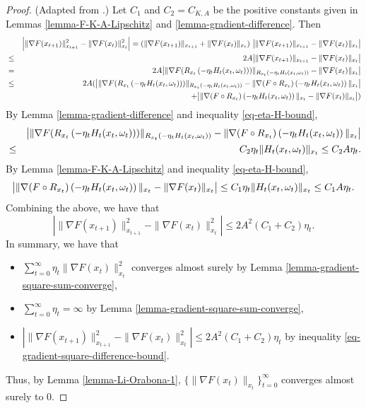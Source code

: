 \documentclass{amsart}
\theoremstyle{plain}
\theoremstyle{definition}
\theoremstyle{remark}
\numberwithin{theorem}{section}
\numberwithin{equation}{section}
\begin{document}
\begin{proof} (Adapted from \cite{Li-Orabona}.)
Let $C_1$ and $C_2=C_{K,A}$ be the positive constants given in Lemmas \ref{lemma-F-K-A-Lipschitz} and \ref{lemma-gradient-difference}. Then 
\begin{eqnarray*}
&& \left|\|\nabla F(x_{t+1})\|_{x_{t+1}}^2 -\|\nabla F(x_{t})\|_{x_{t}}^2\right| = (\|\nabla F(x_{t+1})\|_{x_{t+1}}+\|\nabla F(x_{t})\|_{x_{t}})~\big{|}\|\nabla F(x_{t+1})\|_{x_{t+1}} -\|\nabla F(x_{t})\|_{x_{t}}\big{|} \\
& \leq & 2A\big{|}\|\nabla F(x_{t+1})\|_{x_{t+1}} -\|\nabla F(x_{t})\|_{x_{t}}\big{|}\\
& = & 2A\big{|}\|\nabla F(R_{x_t}\left(-\eta_t H_t(x_t,\omega_t)\right))\|_{R_{x_t}\left(-\eta_t H_t(x_t,\omega_t)\right)} -\|\nabla F(x_{t})\|_{x_{t}}\big{|} \\
& \leq & 2A(\big{|}\|\nabla F(R_{x_t}\left(-\eta_t H_t(x_t,\omega_t)\right))\|_{R_{x_t}\left(-\eta_t H_t(x_t,\omega_t)\right)} -\|\nabla (F\circ R_{x_t})\left(-\eta_t H_t(x_t,\omega_t)\right)\|_{x_{t}}\big{|} \\
&& +  \big{|} \|\nabla (F\circ R_{x_t})\left(-\eta_t H_t(x_t,\omega_t)\right)\|_{x_{t}}  -\|\nabla F(x_{t})\|_{x_{t}}\big{|})
\end{eqnarray*}
By Lemma \ref{lemma-gradient-difference} and inequality \eqref{eq-eta-H-bound},
\begin{eqnarray*}
&& \big{|}\|\nabla F(R_{x_t}\left(-\eta_t H_t(x_t,\omega_t)\right))\|_{R_{x_t}\left(-\eta_t H_t(x_t,\omega_t)\right)} -\|\nabla (F\circ R_{x_t})\left(-\eta_t H_t(x_t,\omega_t)\right)\|_{x_{t}}\big{|} \\
& \leq &  C_2 \eta_t  \|H_t(x_t,\omega_t)\|_{x_{t}} \leq C_2 A \eta_t.
\end{eqnarray*}
By Lemma \ref{lemma-F-K-A-Lipschitz} and inequality \eqref{eq-eta-H-bound},
\[
\big{|} \|\nabla (F\circ R_{x_t})\left(-\eta_t H_t(x_t,\omega_t)\right)\|_{x_{t}} -\|\nabla F(x_{t})\|_{x_{t}}\big{|} \leq C_1\eta_t  \|H_t(x_t,\omega_t)\|_{x_{t}}\leq C_1 A \eta_t.
\]
Combining the above, we have that
\begin{equation}\label{eq-gradient-square-difference-bound}
\left|\|\nabla F(x_{t+1})\|_{x_{t+1}}^2 -\|\nabla F(x_{t})\|_{x_{t}}^2\right| \leq 2 A^2 (C_1+C_2) \eta_t.
\end{equation}
In summary, we have that
\begin{itemize}
	\item $\sum_{t=0}^\infty \eta_t\| \nabla F(x_t)\|_{x_t}^2$ converges almost surely by Lemma \ref{lemma-gradient-square-sum-converge},
	\item $\sum_{t=0}^\infty \eta_t = \infty$ by Lemma \ref{lemma-gradient-square-sum-converge},
	\item $\left|\|\nabla F(x_{t+1})\|_{x_{t+1}}^2 -\|\nabla F(x_{t})\|_{x_{t}}^2\right| \leq 2 A^2 (C_1+C_2) \eta_t$ by inequality \eqref{eq-gradient-square-difference-bound}.
\end{itemize}
Thus, by Lemma \ref{lemma-Li-Orabona-1}, $\{\|\nabla F(x_t)\|_{x_t}\}_{t=0}^\infty$ converges almost surely to $0$.
\end{proof}
\end{document}
